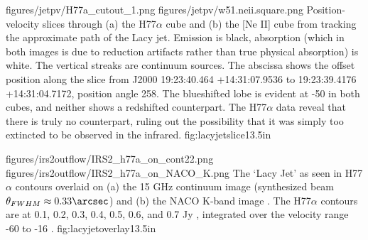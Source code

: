 \FigureTwo
{figures/jetpv/H77a_cutout_1.png}
{figures/jetpv/w51.neii.square.png}
{Position-velocity slices through (a) the H77$\alpha$ cube and (b) the [Ne II]
cube from \citet{Lacy2007a} tracking the approximate path of the Lacy jet.  Emission is black,
absorption (which in both images is due to reduction artifacts rather than true
physical absorption) is white.  The vertical streaks are continuum sources.
The
abscissa shows the offset position along the slice from J2000 19:23:40.464
+14:31:07.9536 to 19:23:39.4176 +14:31:04.7172, position angle 258\arcdeg.
The blueshifted lobe is evident at -50 \kms in both cubes, and neither shows a
redshifted counterpart.  The H77$\alpha$ data reveal that there is truly no
counterpart, ruling out the possibility that it was simply too extincted to be
observed in the infrared.}
{fig:lacyjetslice}{1}{3.5in}


\FigureTwo
{figures/irs2outflow/IRS2_h77a_on_cont22.png} %
{figures/irs2outflow/IRS2_h77a_on_NACO_K.png} %
{The `Lacy Jet' as seen in H77$\alpha$ contours overlaid on (a) the 15 GHz
continuum image (synthesized beam $\theta_{FWHM}\approx0.33\arcsec$) and (b)
the NACO K-band image \citep[resolution $\approx0.2\arcsec$][]{Barbosa2008a}.
The H77$\alpha$ contours are at 0.1, 0.2, 0.3, 0.4, 0.5, 0.6, and 0.7 Jy \kms,
integrated over the velocity range -60 to -16 \kms.}
{fig:lacyjetoverlay}{1}{3.5in}

